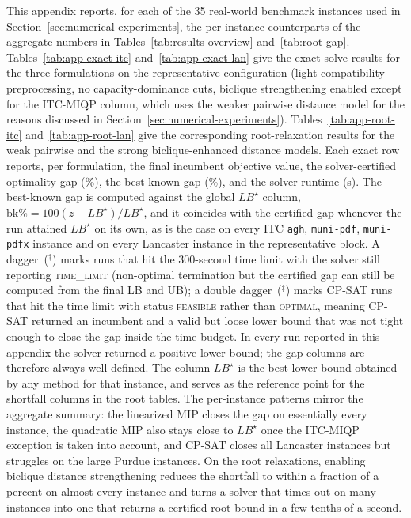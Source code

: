 \documentclass[11pt]{article}
\begin{document}
This appendix reports, for each of the 35 real-world benchmark instances used in
Section~\ref{sec:numerical-experiments}, the per-instance counterparts of the
aggregate numbers in Tables~\ref{tab:results-overview} and~\ref{tab:root-gap}.
Tables~\ref{tab:app-exact-itc} and~\ref{tab:app-exact-lan} give the exact-solve
results for the three formulations on the representative configuration (light
compatibility preprocessing, no capacity-dominance cuts, biclique strengthening
enabled except for the ITC-MIQP column, which uses the weaker pairwise distance
model for the reasons discussed in Section~\ref{sec:numerical-experiments}).
Tables~\ref{tab:app-root-itc} and~\ref{tab:app-root-lan} give the corresponding
root-relaxation results for the weak pairwise and the strong biclique-enhanced
distance models.
Each exact row reports, per formulation, the final incumbent objective value,
the solver-certified optimality gap (\%), the best-known gap (\%), and the
solver runtime (s). The best-known gap is computed against the global
$LB^\star$ column, $\mathrm{bk}\% = 100 (z - LB^\star)/LB^\star$, and it
coincides with the certified gap whenever the run attained $LB^\star$ on its
own, as is the case on every ITC \texttt{agh}, \texttt{muni-pdf},
\texttt{muni-pdfx} instance and on every Lancaster instance in the
representative block.
A dagger~($^\dagger$) marks runs that hit the 300-second time limit with
the solver still reporting \textsc{time\_limit} (non-optimal termination
but the certified gap can still be computed from the final LB and UB);
a double dagger~($^\ddagger$) marks CP-SAT runs that hit the time limit
with status \textsc{feasible} rather than \textsc{optimal}, meaning
CP-SAT returned an incumbent and a valid but loose lower bound that was
not tight enough to close the gap inside the time budget. In every run
reported in this appendix the solver returned a positive lower bound;
the gap columns are therefore always well-defined.
The column $LB^\star$ is the best lower bound obtained by any method for that
instance, and serves as the reference point for the shortfall columns in the
root tables.
The per-instance patterns mirror the aggregate summary: the linearized MIP
closes the gap on essentially every instance, the quadratic MIP also stays
close to $LB^\star$ once the ITC-MIQP exception is taken into account, and
CP-SAT closes all Lancaster instances but struggles on the large Purdue
instances. On the root relaxations, enabling biclique distance
strengthening reduces the shortfall to within a fraction of a percent on
almost every instance and turns a solver that times out on many instances
into one that returns a certified root bound in a few tenths of a second.
\end{document}
